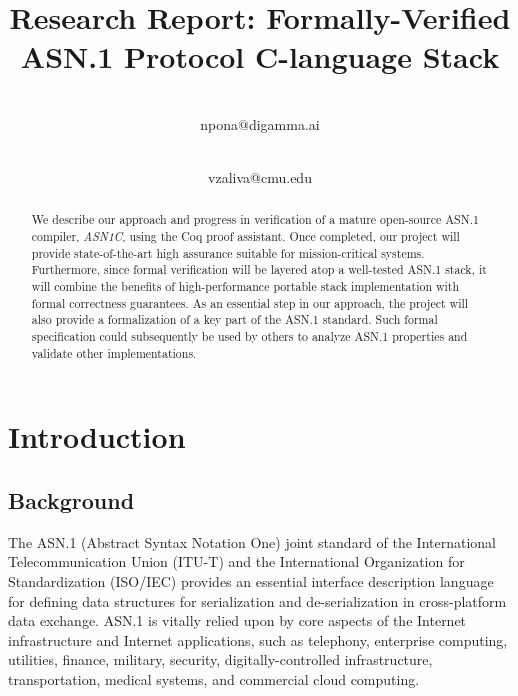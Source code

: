 \documentclass[10p,conference]{IEEEtran}
\begin{document}
\title{Research Report: Formally-Verified ASN.1 Protocol C-language Stack}

\author{

 \\ npona@digamma.ai

\and


\\vzaliva@cmu.edu

}


\maketitle

\begin{abstract}

    We describe our approach and progress in verification of a
  mature open-source ASN.1 compiler, \emph{ASN1C}, using the Coq proof
  assistant. Once completed, our project will provide state-of-the-art
  high assurance suitable for mission-critical systems. Furthermore, since
  formal verification will be layered atop a well-tested ASN.1
  stack, it will combine the benefits of high-performance portable
  stack implementation with formal correctness guarantees. As an essential step in our
  approach, the project will also provide a formalization of a key part of
  the ASN.1 standard. Such formal specification could subsequently be
  used by others to analyze ASN.1 properties and validate other
  implementations.

\end{abstract}

\section{Introduction}

\subsection{Background}

The ASN.1 (Abstract Syntax
Notation One) \cite{ASN1Intro} joint standard of the International
Telecommunication Union (ITU-T) and the International Organization for
Standardization (ISO/IEC) provides an essential interface description
language for defining data structures for serialization and
de-serialization in cross-platform data exchange.
 ASN.1 is vitally relied upon by core aspects of the
Internet infrastructure and Internet applications, such as telephony,
enterprise computing, utilities, finance, military, security,
digitally-controlled infrastructure, transportation, medical systems,
and commercial cloud computing.
\end{document}
